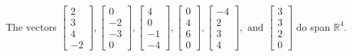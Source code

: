 \begin{exercise}
\begin{exerciseStatement}
  \end{exerciseStatement}
  \begin{exerciseAnswer}
   The vectors \(\left[\begin{array}{r}
2 \\
3 \\
4 \\
-2
\end{array}\right] , \left[\begin{array}{r}
0 \\
-2 \\
-3 \\
0
\end{array}\right] , \left[\begin{array}{r}
4 \\
0 \\
-1 \\
-4
\end{array}\right] , \left[\begin{array}{r}
0 \\
4 \\
6 \\
0
\end{array}\right] , \left[\begin{array}{r}
-4 \\
2 \\
3 \\
4
\end{array}\right] , \text{ and } \left[\begin{array}{r}
3 \\
3 \\
2 \\
0
\end{array}\right]\) 
  	 do  
	span \(\mathbb{R}^4\).
  


  \end{exerciseAnswer}
\end{exercise}